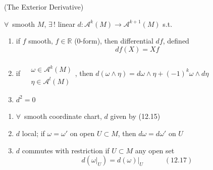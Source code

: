 \begin{theorem}[12.14] (The Exterior Derivative) 

$\forall \, $ smooth $M$, $\exists \, !$ linear $d: \mathcal{A}^k(M) \to \mathcal{A}^{k+1}(M)$ s.t. 
\begin{enumerate}
\item[(i)] if $f$ smooth, $f\in \mathbb{R}$ (0-form), then differential $df$, defined 
\[
df(X) = Xf
\]
\item[(ii)] if $\begin{aligned} & \quad \\ & \omega \in \mathcal{A}^k(M) \\ & \eta \in \mathcal{A}^l(M) \end{aligned}$, then $d(\omega \wedge \eta) = d\omega \wedge \eta + (-1)^k \omega \wedge d\eta $
\item[(iii)] $d^2 =0$
\end{enumerate}
\begin{enumerate}
  \item[(a)] $\forall \, $ smooth coordinate chart, $d$ given by (12.15) 
  \item[(b)] $d$ local; if $\omega = \omega'$ on open $U \subset M$, then $d\omega = d\omega'$ on $U$
  \item[(c)] $d$ commutes with restriction if $U \subset M$ any open set
    \begin{equation}
      d(\left. \omega \right|_U ) = \left. d(\omega ) \right|_U \quad \quad \quad (12.17)
    \end{equation}
\end{enumerate}
\end{theorem}


